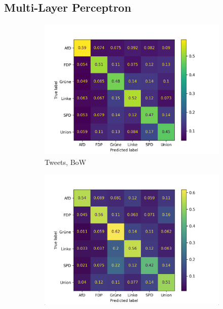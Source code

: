 \subsection*{Multi-Layer Perceptron}

\begin{figure}[H]
    \centering
    \begin{subfigure}{0.49\textwidth}
        \includegraphics[width=\textwidth]{data/images/modeling/mlp/none/tweets_confusion_matrix.png}
        \caption{Tweets, \ac{BoW}}
        \label{sfig:confusionMatrixMlpTweetsUnbalanced}
    \end{subfigure}
    \hfill
    \begin{subfigure}{0.49\textwidth}
        \includegraphics[width=\textwidth]{data/images/modeling/mlp/none/party_programs_confusion_matrix.png}

\end{subfigure}
\end{figure}
